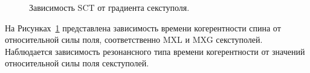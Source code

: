 \begin{figure}[h]\centering
	\caption{Зависимость SCT от градиента секступоля.\label{fig:SCT_scan}}
\end{figure}

На Рисунках~\ref{fig:SCT_scan} представлена зависимость времени когерентности спина от относительной силы поля, соответственно MXL и MXG секступолей. Наблюдается зависимость резонансного типа времени когерентности от значений относительной силы поля секступолей.